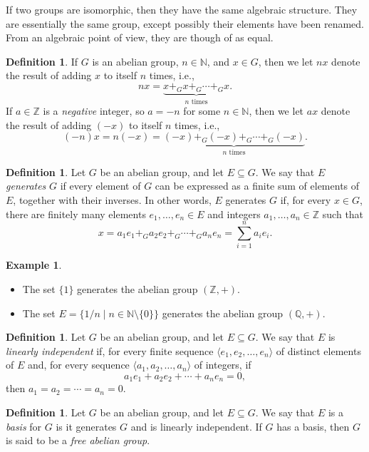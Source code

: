 \documentclass[a4paper]{memoir}
\theoremstyle{definition}
\newtheorem{definition}[theorem]{Definition}
\newtheorem{example}[theorem]{Example}
\newcommand{\bb}{\mathbb}
\begin{document}
If two groups are isomorphic, then they have the same algebraic structure. They are essentially 
the same group, except possibly their elements have been renamed. From an algebraic point of 
view, they are though of as equal.

\begin{definition}
  If $G$ is an abelian group, $n \in \bb{N}$, and $x \in G$, then we let $nx$ denote the result of 
  adding $x$ to itself $n$ times, i.e., 
  \[
    nx = \underbrace{x +_G x +_G \cdots +_G x}_{\text{$n$ times}}.
  \]
  If $a \in \bb{Z}$ is a \emph{negative} integer, so $a = -n$ for some $n \in \bb{N}$, then we 
  let $ax$ denote the result of adding $(-x)$ to itself $n$ times, i.e.,
  \[
    (-n)x = n(-x) = \underbrace{(-x) +_G (-x) +_G \cdots +_G (-x)}_{\text{$n$ times}}.
  \]
\end{definition}

\begin{definition}
  Let $G$ be an abelian group, and let $E \subseteq G$. We say that $E$ \emph{generates} $G$ 
  if every element of $G$ can be expressed as a finite sum of elements of $E$, together with 
  their inverses. In other words, $E$ generates $G$ if, for every $x \in G$, there are 
  finitely many elements $e_1, \ldots, e_n \in E$ and integers $a_1, \ldots, a_n \in \bb{Z}$ 
  such that
  \[
    x = a_1e_1 +_G a_2e_2 +_G \cdots +_G a_ne_n = \sum_{i=1}^n a_ie_i.
  \] 
\end{definition}

\begin{example}
  \begin{itemize}
    \item The set $\{1\}$ generates the abelian group $(\bb{Z}, +)$.
    \item The set $E = \{1/n \mid n \in \bb{N} \setminus \{0\}\}$ generates the 
    abelian group $(\bb{Q}, +)$.
  \end{itemize}
\end{example}

\begin{definition}
  Let $G$ be an abelian group, and let $E \subseteq G$. We say that $E$ is \emph{linearly 
  independent} if, for every finite sequence $\langle e_1, e_2, \ldots, e_n \rangle$ of 
  distinct elements of $E$ and, for every sequence $\langle a_1, a_2, \ldots, a_n \rangle$ 
  of integers, if
  \[
    a_1e_1 + a_2e_2 + \cdots + a_ne_n = 0,
  \]
  then $a_1 = a_2 = \cdots = a_n = 0$.
\end{definition}

\begin{definition}
  Let $G$ be an abelian group, and let $E \subseteq G$. We say that $E$ is a \emph{basis} 
  for $G$ is it generates $G$ and is linearly independent. If $G$ has a basis, then 
  $G$ is said to be a \emph{free abelian group}.
\end{definition}
\end{document}

